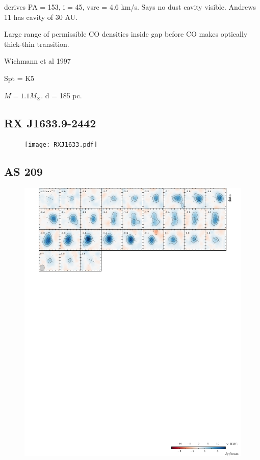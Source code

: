 \documentclass{aastex6}
\begin{document}
\citep{vandermarel15} derives PA = 153, i = 45, vsrc = 4.6 km/s. Says no dust cavity visible. Andrews 11 has cavity of 30 AU.

Large range of permissible CO densities inside gap before CO makes optically thick-thin transition.

\citep{andrews11}
Wichmann et al 1997

Spt = K5

$M = 1.1 M_\odot$.
d = 185 pc.

\subsection{RX J1633.9-2442}

\begin{figure}[htb]
\begin{center}
  \texttt{[image: RXJ1633.pdf]}
  \end{center}
\end{figure}

\subsection{AS 209}



\begin{figure}[htb]
\begin{center}
  \includegraphics{AS209.pdf}
  \end{center}
\end{figure}
\end{document}
